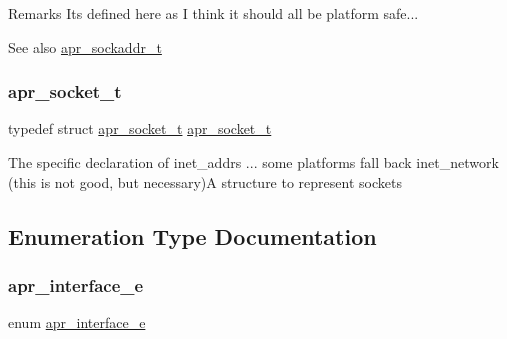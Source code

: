 \begin{DoxyRemark}{Remarks}
It\textquotesingle{}s defined here as I think it should all be platform safe... 
\end{DoxyRemark}
\begin{DoxySeeAlso}{See also}
\mbox{\hyperlink{structapr__sockaddr__t}{apr\+\_\+sockaddr\+\_\+t}} 
\end{DoxySeeAlso}
\mbox{\label{group__apr__network__io_ga49262b223e7434746e1f1737659aa2c3}} 
\subsubsection{\texorpdfstring{apr\+\_\+socket\+\_\+t}{apr\_socket\_t}}
{\footnotesize\ttfamily typedef struct \mbox{\hyperlink{structapr__socket__t}{apr\+\_\+socket\+\_\+t}} \mbox{\hyperlink{structapr__socket__t}{apr\+\_\+socket\+\_\+t}}}

The specific declaration of inet\+\_\+addr\textquotesingle{}s ... some platforms fall back inet\+\_\+network (this is not good, but necessary)A structure to represent sockets 

\subsection{Enumeration Type Documentation}
\mbox{\label{group__apr__network__io_ga1982f44f48fdf00a8bd754bc7b773edc}} 
\subsubsection{\texorpdfstring{apr\+\_\+interface\+\_\+e}{apr\_interface\_e}}
{\footnotesize\ttfamily enum \mbox{\hyperlink{group__apr__network__io_ga1982f44f48fdf00a8bd754bc7b773edc}{apr\+\_\+interface\+\_\+e}}}

